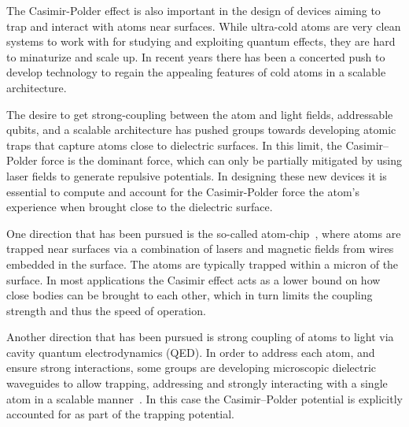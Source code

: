 
    The Casimir-Polder effect is also important in the design of devices aiming to trap and interact
    with atoms near surfaces.  While ultra-cold atoms are very clean systems to work with for 
    studying and exploiting quantum effects, they are hard to minaturize and scale up.  In recent
    years there has been a concerted push to develop technology to regain the appealing features 
    of cold atoms in a scalable architecture. 

The desire to get strong-coupling between the atom and light fields, addressable qubits, and a scalable
architecture has pushed groups towards developing atomic traps that capture atoms close to dielectric surfaces.  
In this limit, the Casimir--Polder force is the dominant force, which can only be partially mitigated
by using laser fields to generate repulsive potentials.
  In designing these new devices it is essential to compute and account for the Casimir-Polder force
the atom's experience when brought close to the dielectric surface.  

    One direction that has been pursued is the so-called atom-chip~\cite{Folman2000,Schneider2003},
    where atoms are trapped near surfaces via a combination of lasers and magnetic fields from wires embedded in
    the surface.  The atoms are typically trapped within a micron of the surface.  
    In most applications the Casimir effect acts as a lower bound on how close bodies can be brought 
    to each other, which in turn limits the coupling strength and thus the speed of operation.  

    Another direction that has been pursued is strong coupling of atoms to light via cavity 
    quantum electrodynamics (QED).  
    In order to address each atom, and ensure strong interactions, some groups 
    are developing microscopic dielectric waveguides to allow trapping, addressing and strongly interacting with a 
    single atom in a scalable manner~\cite{Alton2011, Hung2013, Goban2014}.  In this case
    the Casimir--Polder potential is explicitly accounted for as part of the trapping potential.
    
